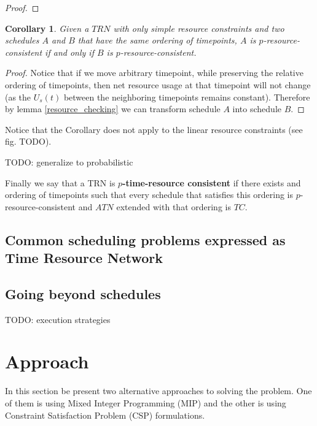 \documentclass{article}
\newtheorem{corollary}{Corollary}[theorem]
\begin{document}
\begin{multicols}{2}
\begin{proof}
\end{proof}
\begin{corollary}
\label{cor:ordering}
Given a $TRN$ with only simple resource constraints and two schedules $A$ and $B$ that have the same ordering of timepoints, $A$ is $p$-resource-consistent if and only if $B$ is $p$-resource-consistent.
\end{corollary}
\begin{proof}
Notice that if we move arbitrary timepoint, while preserving the relative ordering of timepoints, then net resource usage at that timepoint will not change (as the $U_s(t)$ between the neighboring timepoints remains constant). Therefore by lemma \ref{resource_checking} we can transform schedule $A$ into schedule $B$.
\end{proof}
Notice that the Corollary does not apply to the linear resource constraints (see fig. TODO).

TODO: generalize to probabilistic

Finally we say that a TRN is \textbf{$p$-time-resource consistent} if there exists and ordering of timepoints such that every schedule that satisfies this ordering is $p$-resource-consistent and $ATN$ extended with that ordering is $TC$.

\subsection{Common scheduling problems expressed as Time Resource Network}

\subsection{Going beyond schedules}
TODO: execution strategies

\section{Approach}
In this section be present two alternative approaches to solving the problem. One of them is using Mixed Integer Programming (MIP) and the other is using Constraint Satisfaction Problem (CSP) formulations.

\end{multicols}
\end{document}

